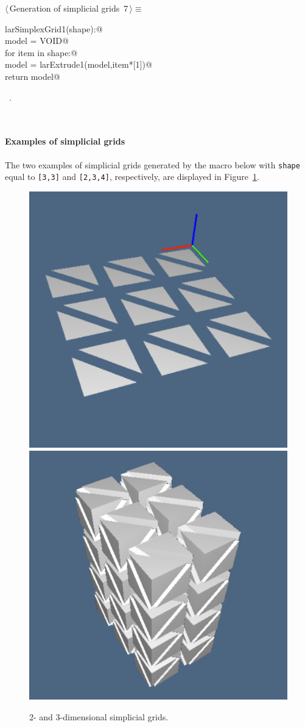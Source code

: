 \documentclass[11pt,oneside]{article}	%
\begin{document}
\begin{flushleft} \small
\begin{minipage}{\linewidth} \label{scrap6}
\protect{}$\langle\,$Generation of simplicial grids\nobreak\ {\footnotesize 7}$\,\rangle\equiv$
\vspace{-1ex}
\begin{list}{}{} \item
\mbox{}\verb@def larSimplexGrid1(shape):@\\
\mbox{}\verb@    model = VOID@\\
\mbox{}\verb@    for item in shape:@\\
\mbox{}\verb@        model = larExtrude1(model,item*[1])@\\
\mbox{}\verb@    return model@\\
\mbox{}\verb@@{\NWsep}
\end{list}
\vspace{-1ex}
\footnotesize\addtolength{\baselineskip}{-1ex}
\begin{list}{}{\setlength{\itemsep}{-\parsep}\setlength{\itemindent}{-\leftmargin}}
\item \NWtxtMacroRefIn\ .
\end{list}
\end{minipage}\\[4ex]
\end{flushleft}


\paragraph{Examples of simplicial grids} The two examples of simplicial grids generated by the macro below with \texttt{shape} equal to \texttt{[3,3]} and \texttt{[2,3,4]}, respectively, are displayed in Figure~\ref{fig:simplexn-3}.

\begin{figure}[htbp] %
   \centering
   \includegraphics[height=0.25\linewidth,width=0.25\linewidth]{images/simplexn-3a} 
   \includegraphics[height=0.25\linewidth,width=0.25\linewidth]{images/simplexn-3b} 
   \caption{2- and 3-dimensional simplicial grids.}
   \label{fig:simplexn-3}
\end{figure}
\end{document}
